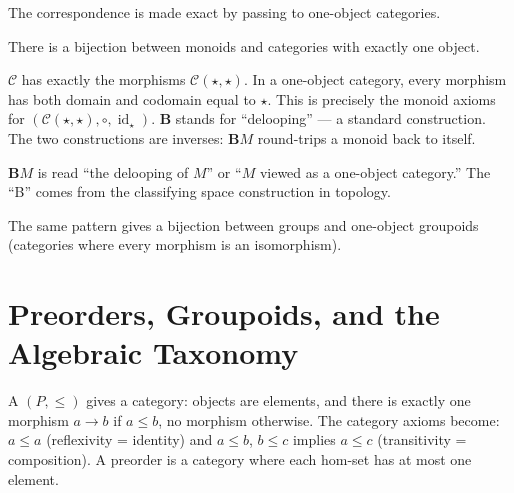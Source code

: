 The correspondence is made exact by passing to one-object categories.

\begin{theorem}
There is a bijection between monoids and categories with exactly one object.
\end{theorem}

\begin{prooflog}
           {$\mathcal{C}$ has exactly the morphisms $\mathcal{C}(\star, \star)$.}
           {In a one-object category, every morphism has both domain and codomain equal to $\star$.}
           {This is precisely the monoid axioms for $(\mathcal{C}(\star,\star), \circ, \operatorname{id}_\star)$.}
           {$\mathbf{B}$ stands for ``delooping'' — a standard construction.}
           {The two constructions are inverses: $\mathbf{B}M$ round-trips a monoid
            back to itself.}
\end{prooflog}

\begin{howtosay}
$\mathbf{B}M$ is read ``the delooping of $M$'' or ``$M$ viewed as a one-object category.''
The ``B'' comes from the classifying space construction in topology.
\end{howtosay}

The same pattern gives a bijection between groups and one-object groupoids (categories
where every morphism is an isomorphism).

\section{Preorders, Groupoids, and the Algebraic Taxonomy}

A  $(P, \leq)$ gives a category: objects are elements, and there
is exactly one morphism $a \to b$ if $a \leq b$, no morphism otherwise. The
category axioms become: $a \leq a$ (reflexivity = identity) and $a \leq b$,
$b \leq c$ implies $a \leq c$ (transitivity = composition). A preorder is
a category where each hom-set has at most one element.

